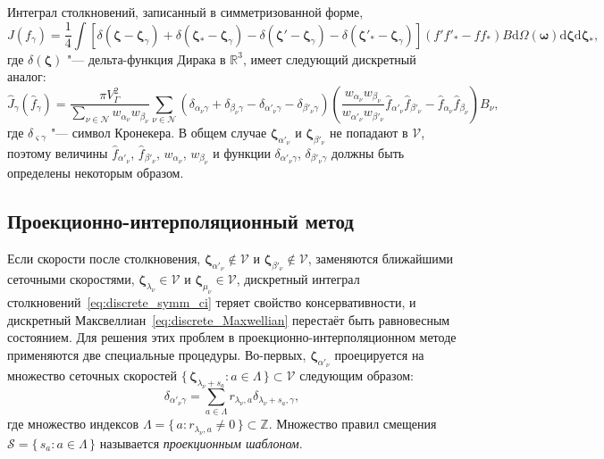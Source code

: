 \documentclass[
aps,%
12pt,%
final,%
notitlepage,%
oneside,%
onecolumn,%
nobibnotes,%
nofootinbib,%
superscriptaddress,%
noshowpacs,%
showkeys,%
floatfix,%
tightenlines,%
centertags]%
{revtex4}
\newcommand{\dd}{\mathrm{d}}
\newcommand{\dzeta}{\boldsymbol{\dd\zeta}}
\newcommand{\bzeta}{\boldsymbol{\zeta}}
\newcommand{\Nu}{\mathcal{N}}
\newcommand{\Set}[2]{\{\,{#1}:{#2}\,\}}
\begin{document}
Интеграл столкновений, записанный в симметризованной форме,
\begin{equation}\label{eq:symm_ci}
    J(f_\gamma) = \frac14\int \left[
        \delta(\bzeta-\bzeta_\gamma) + \delta(\bzeta_*-\bzeta_\gamma)
        - \delta(\bzeta'-\bzeta_\gamma) - \delta(\bzeta'_*-\bzeta_\gamma)\right]
        (f'f'_* - ff_*)B \dd\Omega(\boldsymbol{\omega}) \dzeta\dzeta_*,
\end{equation}
где \(\delta(\bzeta)\) "--- дельта-функция Дирака в \(\mathbb{R}^3\),
имеет следующий дискретный аналог:
\begin{equation}\label{eq:discrete_symm_ci}
    \hat{J}_\gamma(\hat{f}_\gamma) =
        \frac{\pi V_\Gamma^2}{\sum_{\nu\in\Nu} w_{\alpha_\nu}w_{\beta_\nu}}
        \sum_{\nu\in\Nu} \left(
            \delta_{\alpha_\nu\gamma} + \delta_{\beta_\nu\gamma}
            - \delta_{\alpha'_\nu\gamma} - \delta_{\beta'_\nu\gamma}
        \right)\left(
            \frac{w_{\alpha_\nu}w_{\beta_\nu}}{w_{\alpha'_\nu}w_{\beta'_\nu}}
            \hat{f}_{\alpha'_\nu}\hat{f}_{\beta'_\nu} - \hat{f}_{\alpha_\nu}\hat{f}_{\beta_\nu}
        \right)B_\nu,
\end{equation}
где \(\delta_{\varsigma\gamma}\) "--- символ Кронекера.
В общем случае \(\bzeta_{\alpha'_\nu}\) и \(\bzeta_{\beta'_\nu}\) не попадают в \(\mathcal{V}\),
поэтому величины \(\hat{f}_{\alpha'_\nu}\), \(\hat{f}_{\beta'_\nu}\), \(w_{\alpha_\nu}\), \(w_{\beta_\nu}\)
и функции \(\delta_{\alpha'_\nu\gamma}\), \(\delta_{\beta'_\nu\gamma}\) должны быть определены некоторым образом.

\subsection{Проекционно-интерполяционный метод}

Если скорости после столкновения,
\(\bzeta_{\alpha'_\nu}\notin\mathcal{V}\) и \(\bzeta_{\beta'_\nu}\notin\mathcal{V}\),
заменяются ближайшими сеточными скоростями,
\(\bzeta_{\lambda_\nu}\in\mathcal{V}\) и \(\bzeta_{\mu_\nu}\in\mathcal{V}\),
дискретный интеграл столкновений~\eqref{eq:discrete_symm_ci} теряет свойство консервативности,
и дискретный Максвеллиан~\eqref{eq:discrete_Maxwellian} перестаёт быть равновесным состоянием.
Для решения этих проблем в проекционно-интерполяционном методе применяются две специальные процедуры.
Во-первых, \(\bzeta_{\alpha'_\nu}\) проецируется на множество сеточных скоростей
\(\Set{\bzeta_{\lambda_\nu+s_a}}{a\in\Lambda}\subset\mathcal{V}\) следующим образом:
\begin{equation}\label{eq:ci_projection}
    \delta_{\alpha'_\nu\gamma} = \sum_{a\in\Lambda} r_{\lambda_\nu,a}\delta_{\lambda_\nu+s_a,\gamma},
\end{equation}
где множество индексов \(\Lambda = \Set{a}{r_{\lambda_\nu,a}\neq0}\subset\mathbb{Z}\).
Множество правил смещения \(\mathcal{S} = \Set{s_a}{a\in\Lambda}\)
называется \emph{проекционным шаблоном}.
\end{document}
